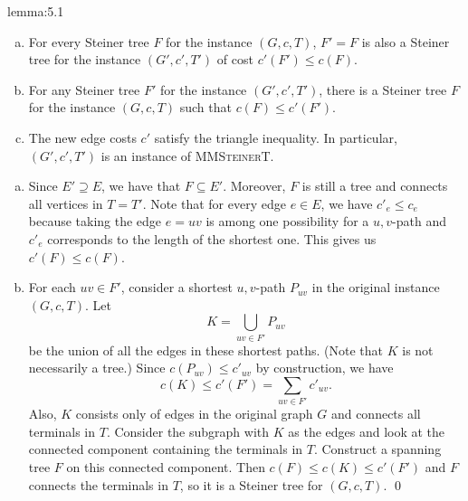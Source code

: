 \begin{lemma}{lemma:5.1}
    \begin{enumerate}[(a)]
        \item For every Steiner tree $F$ for the instance 
        $(G, c, T)$, $F' = F$ is also a Steiner tree for the 
        instance $(G', c', T')$ of cost 
        $c'(F') \leq c(F)$. 
        \item For any Steiner tree $F'$ for the instance 
        $(G', c', T')$, there is a Steiner tree $F$ for the 
        instance $(G, c, T)$ such that $c(F) \leq c'(F')$. 
        \item The new edge costs $c'$ satisfy the triangle inequality. In particular, 
        $(G', c', T')$ is an instance of \textsc{MMSteinerT}.
    \end{enumerate}
\end{lemma}\vspace{-0.25cm}
\begin{pf}
    \begin{enumerate}[(a)]
        \item Since $E' \supseteq E$, we have that $F \subseteq E'$. Moreover, 
        $F$ is still a tree and connects all vertices in $T = T'$. Note that 
        for every edge $e \in E$, we have $c'_e \leq c_e$ because 
        taking the edge $e = uv$ is among one possibility for a $u,v$-path
        and $c'_e$ corresponds to the length of the shortest one. This 
        gives us $c'(F) \leq c(F)$. 
        \item For each $uv \in F'$, consider a shortest $u, v$-path 
        $P_{uv}$ in the original instance $(G, c, T)$. Let 
        \[ K = \bigcup_{uv \in F'} P_{uv} \] 
        be the union of all the edges in these shortest paths. (Note that 
        $K$ is not necessarily a tree.) Since $c(P_{uv}) \leq c'_{uv}$ 
        by construction, we have 
        \[ c(K) \leq c'(F') = \sum_{uv \in F'} c'_{uv}. \]
        Also, $K$ consists only of edges in the original graph $G$ and 
        connects all terminals in $T$. Consider the subgraph  
        with $K$ as the edges and look at the connected component containing 
        the terminals in $T$. Construct a spanning tree $F$ on this connected 
        component. Then $c(F) \leq c(K) \leq c'(F')$ and $F$ connects 
        the terminals in $T$, so it is a Steiner tree for $(G, c, T)$. \qed
    \end{enumerate} 
\end{pf}\vspace{-0.25cm}